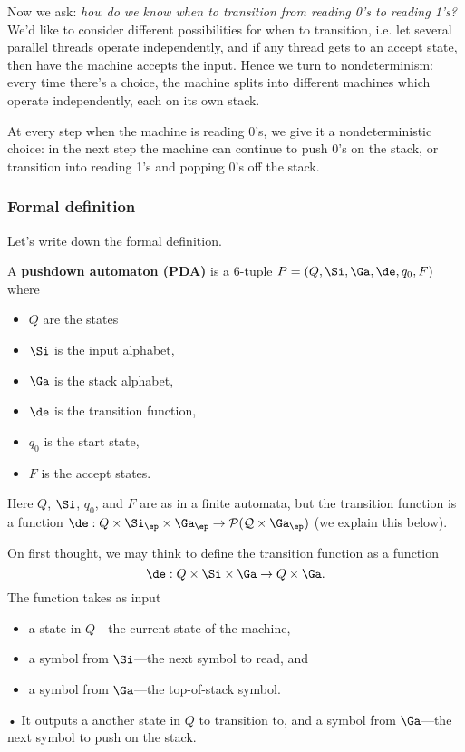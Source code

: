 \begin{ex}
Now we ask: {\it how do we know when to transition from reading 0's to reading 1's?} %
We'd like to consider different possibilities for when to transition, i.e. let several parallel threads operate independently, and if any thread gets to an accept state, then have the machine accepts the input. Hence we turn to nondeterminism: every time there's a choice, the machine splits into different machines which operate independently, each on its own stack. 

At every step when the machine is reading 0's, we give it a nondeterministic choice: in the next step the machine can continue to push 0's on the stack, or transition into reading 1's and popping 0's off the stack. 
\end{ex}

\subsubsection{Formal definition}
Let's write down the formal definition.
\begin{df}
A \textbf{pushdown automaton (PDA)} is a 6-tuple $P=(Q,\Si, \Ga, \de,q_0,F)$
where 
\begin{itemize}
\item
$Q$ are the states
\item 
$\Si$ is the input alphabet,
\item
$\Ga$ is the stack alphabet,
\item
$\de$ is the transition function,
\item
$q_0$ is the start state,
\item 
$F$ is the accept states.
\end{itemize}
Here $Q$, $\Si$, $q_0$, and $F$ are as in a finite automata, but the transition function is a function $\de:Q\times \Si_{\ep}\times\Ga_{\ep}\to \cal P(Q\times \Ga_{\ep})$ (we explain this below).
\end{df}
On first thought, we may think to define the transition function as a function 
\[\de:Q\times \Si\times \Ga\to Q\times \Ga.\]
The function takes as input 
\begin{itemize}
\item
a state in $Q$---the current state of the machine,
\item
a symbol from $\Si$---the next symbol to read, and
\item
a symbol from $\Ga$---the top-of-stack symbol.
\end{itemize}•
It outputs a another state in $Q$ to transition to, and a symbol from $\Ga$---the next symbol to push on the stack.

